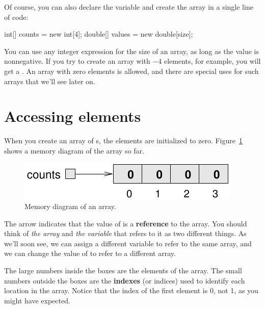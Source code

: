 Of course, you can also declare the variable and create the array in a single line of code:

\begin{code}
int[] counts = new int[4];
double[] values = new double[size];
\end{code}


You can use any integer expression for the size of an array, as long as the value is nonnegative.
If you try to create an array with $-4$ elements, for example, you will get a .
An array with zero elements is allowed, and there are special uses for such arrays that we'll see later on.


\section{Accessing elements}
\label{elements}


When you create an array of s, the elements are initialized to zero.
Figure~\ref{fig.array} shows a memory diagram of the  array so far.

\begin{figure}[!ht]
\begin{center}
\includegraphics{figs/array.pdf}
\caption{Memory diagram of an  array.}
\label{fig.array}
\end{center}
\end{figure}


The arrow indicates that the value of  is a {\bf reference} to the array.
You should think of {\em the array} and {\em the variable} that refers to it as two different things.
As we'll soon see, we can assign a different variable to refer to the same array, and we can change the value of  to refer to a different array.


The large numbers inside the boxes are the elements of the array.
The small numbers outside the boxes are the {\bf indexes} (or indices) used to identify each location in the array.
Notice that the index of the first element is 0, not 1, as you might have expected.

